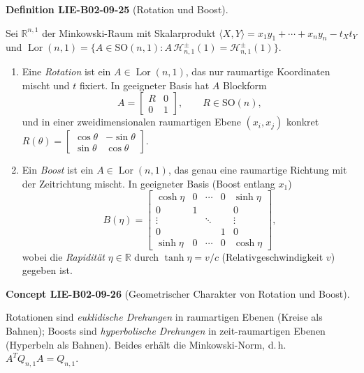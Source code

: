 \documentclass[10pt, letterpaper]{article}
\newcommand{\CustomHeading}[3]{%
  \par\medskip\noindent%
  \textbf{#1 #2} \textnormal{(#3)}.\enskip%
}
\newenvironment{DEF}[2]{\begin{unitbox}\CustomHeading{Definition}{#1}{#2}}{\end{unitbox}}
\newenvironment{CONC}[2]{\begin{unitbox}\CustomHeading{Concept}{#1}{#2}}{\end{unitbox}}
\begin{document}
\begin{DEF}{LIE-B02-09-25}{Rotation und Boost}
Sei $\mathbb{R}^{n,1}$ der Minkowski-Raum mit Skalarprodukt 
$\langle X,Y\rangle = x_1y_1+\cdots+x_ny_n - t_X t_Y$ und 
$\operatorname{Lor}(n,1)=\{A\in \mathrm{SO}(n,1): A\,\mathcal H^{\pm}_{n,1}(1)=\mathcal H^{\pm}_{n,1}(1)\}$.
\begin{enumerate}
\item Eine \emph{Rotation} ist ein $A\in \operatorname{Lor}(n,1)$, das nur raumartige Koordinaten mischt und $t$ fixiert. In geeigneter Basis hat $A$ Blockform
\[
A=\begin{bmatrix}
R & 0\\[2pt]
0 & 1
\end{bmatrix}, 
\qquad R\in \mathrm{SO}(n),
\]
und in einer zweidimensionalen raumartigen Ebene $(x_i,x_j)$ konkret
\(
R(\theta)=\begin{bmatrix}\cos\theta & -\sin\theta\\ \sin\theta & \cos\theta\end{bmatrix}.
\)
\item Ein \emph{Boost} ist ein $A\in \operatorname{Lor}(n,1)$, das genau eine raumartige Richtung mit der Zeitrichtung mischt. In geeigneter Basis (Boost entlang $x_1$)
\[
B(\eta)=
\begin{bmatrix}
\cosh\eta & 0 & \cdots & 0 & \sinh\eta\\
0 & 1 &  &  & 0\\
\vdots &  & \ddots &  & \vdots\\
0 &  &  & 1 & 0\\
\sinh\eta & 0 & \cdots & 0 & \cosh\eta
\end{bmatrix},
\]
wobei die \emph{Rapidität} $\eta\in\mathbb{R}$ durch $\tanh\eta = v/c$ (Relativgeschwindigkeit $v$) gegeben ist.
\end{enumerate}
\end{DEF}



\begin{CONC}{LIE-B02-09-26}{Geometrischer Charakter von Rotation und Boost}
Rotationen sind \emph{euklidische Drehungen} in raumartigen Ebenen (Kreise als Bahnen); Boosts sind \emph{hyperbolische Drehungen} in zeit-raumartigen Ebenen (Hyperbeln als Bahnen). Beides erhält die Minkowski-Norm, d.\,h.\ $A^T Q_{n,1} A=Q_{n,1}$.
\end{CONC}
\end{document}
